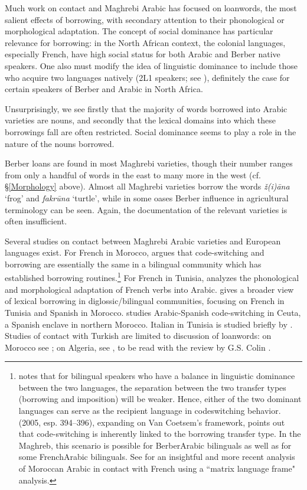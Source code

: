 \documentclass[output=paper]{langsci/langscibook}
\begin{document}
Much work on contact and Maghrebi Arabic has focused on loanwords, the most salient effects of borrowing, with secondary attention to their phonological or morphological adaptation. The concept of social dominance has particular relevance for borrowing: in the North African context, the colonial languages, especially French, have high social status for both Arabic and Berber native speakers. One also must modify the idea of linguistic dominance to include those who acquire two languages natively (2L1 speakers; see \citealt[525]{Lucas2015}), definitely the case for certain speakers of Berber and Arabic in North Africa. 

  Unsurprisingly, we see firstly that the majority of words borrowed into Arabic varieties are nouns, and secondly that the lexical domains into which these borrowings fall are often restricted. Social dominance seems to play a role in the nature of the nouns borrowed.

  Berber loans are found in most Maghrebi varieties, though their number ranges from only a handful of words in the east to many more in the west (cf. §\ref{Morphology} above). Almost all Maghrebi varieties borrow the words \textit{ž(i){\R}āna} ‘frog’ and \textit{fakrūna} ‘turtle’, while in some oases Berber influence in agricultural terminology can be seen. Again, the documentation of the relevant varieties is often insufficient.

Several studies on contact between Maghrebi Arabic varieties and European languages exist. For French in Morocco, \citet{Heath1989} argues that code-switching and borrowing are essentially the same in a bilingual community which has established borrowing routines.\footnote{\citet[87]{VanCoetsem1988} notes that for bilingual speakers who have a balance in linguistic dominance between the two languages, the separation between the two transfer types (borrowing and imposition) will be weaker. Hence, either of the two dominant languages can serve as the recipient language in codeswitching behavior. \citeauthor{Winford2005} (2005, esp. 394–396), expanding on Van Coetsem’s framework, points out that code-switching is inherently linked to the borrowing transfer type. In the Maghreb, this scenario is possible for Berber\textendash Arabic bilinguals as well as for some French\textendash Arabic bilinguals. See \citet{Ziamari2008} for an insightful and more recent analysis of Moroccan Arabic in contact with French using a ``matrix language frame" analysis.} For French in Tunisia, \citet{Talmoudi1986} analyzes the phonological and morphological adaptation of French verbs into Arabic. \citet[127–151]{Sayahi2014} gives a broader view of lexical borrowing in diglossic/bilingual communities, focusing on French in Tunisia and Spanish in Morocco. \citet{Vicente2005} studies Arabic-Spanish code-switching in Ceuta, a Spanish enclave in northern Morocco. Italian in Tunisia is studied briefly by \citet{Cifoletti1994}. Studies of contact with Turkish are limited to discussion of loanwords: on Morocco see \citet{Procházka2012}; on Algeria, see \citet{BenCheneb1922}, to be read with the review by G.S. Colin \citep[21–30]{Colin1999}.
\end{document}
